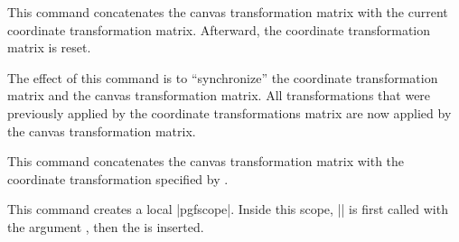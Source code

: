 \begin{command}{\pgflowlevelsynccm}
  This command concatenates the canvas transformation matrix with the
  current coordinate transformation matrix. Afterward, the coordinate
  transformation matrix is reset.

  The effect of this command is to ``synchronize'' the coordinate
  transformation matrix and the canvas transformation matrix. All
  transformations that were previously applied by the coordinate
  transformations matrix are now applied by the canvas transformation
  matrix.

\begin{codeexample}[]
\end{codeexample}
\end{command}


\begin{command}{\pgflowlevel{}}
  This command concatenates the canvas transformation matrix with the
  coordinate transformation specified by .

\begin{codeexample}[]
\end{codeexample}
\end{command}


\begin{command}{\pgflowlevelobj{}}
  This command creates a local |{pgfscope}|. Inside this scope,
  |\pgflowlevel| is first called with the argument
  , then the  is inserted. 

\begin{codeexample}[]
\end{codeexample}
\end{command}


